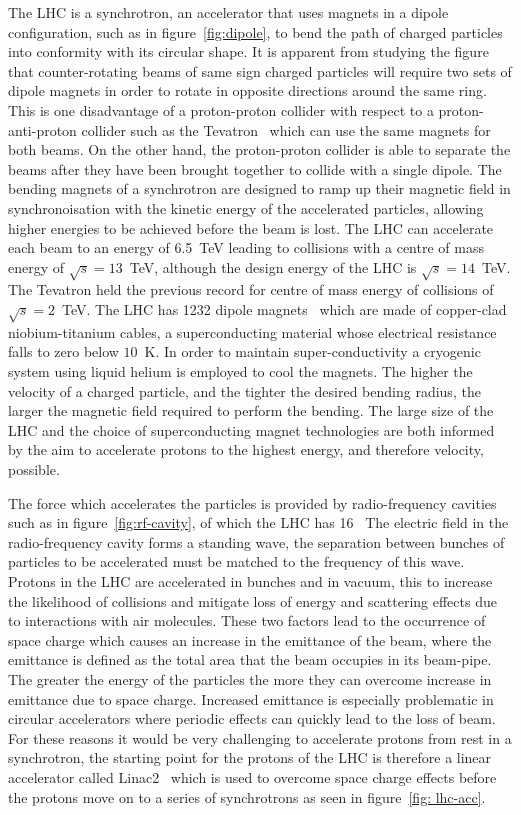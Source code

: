The LHC is a synchrotron, an accelerator that uses magnets in a dipole
configuration, such as in figure~\ref{fig:dipole}, to bend the path of charged
particles into conformity with its circular shape. It is apparent from studying
the figure that counter-rotating beams of same sign charged particles will
require two sets of dipole magnets in order to rotate in opposite directions
around the same ring. This is one disadvantage of a proton-proton collider with
respect to a proton-anti-proton collider such as the Tevatron~\cite{tevatron-01}
which can use the same magnets for both beams. On the other hand, the
proton-proton collider is able to separate the beams after they have been
brought together to collide with a single dipole. The bending magnets of a
synchrotron are designed to ramp up their magnetic field in synchronoisation
with the kinetic energy of the accelerated particles, allowing higher energies
to be achieved before the beam is lost. The LHC can accelerate each beam to an
energy of 6.5~TeV leading to collisions with a centre of mass energy of
$\sqrt{s} = 13 $~TeV, although the design energy of the LHC is $\sqrt{s} = 14
$~TeV. The Tevatron held the previous record for centre of mass energy of
collisions of $\sqrt{s} = 2 $~TeV. The LHC has 1232 dipole magnets~\cite{LHC-dr}
which are made of copper-clad niobium-titanium cables, a superconducting
material whose electrical resistance falls to zero below $10$~K. In order to
maintain super-conductivity a cryogenic system using liquid helium is employed
to cool the magnets. The higher the velocity of a charged particle, and the
tighter the desired bending radius, the larger the magnetic field required to
perform the bending. The large size of the LHC and the choice of superconducting
magnet technologies are both informed by the aim to accelerate protons to the
highest energy, and therefore velocity, possible.


The force which accelerates the particles is provided by radio-frequency
cavities such as in figure~\ref{fig:rf-cavity}, of which the LHC has
16~\cite{LHC-dr} The electric field in the radio-frequency cavity forms a
standing wave, the separation between bunches of particles to be accelerated
must be matched to the frequency of this wave. Protons in the LHC are
accelerated in bunches and in vacuum, this to increase the likelihood of
collisions and mitigate loss of energy and scattering effects due to
interactions with air molecules. These two factors lead to the occurrence of
space charge which causes an increase in the emittance of the beam, where the
emittance is defined as the total area that the beam occupies in its beam-pipe.
The greater the energy of the particles the more they can overcome increase in
emittance due to space charge. Increased emittance is especially problematic in
circular accelerators where periodic effects can quickly lead to the loss of
beam. For these reasons it would be very challenging to accelerate protons from
rest in a synchrotron, the starting point for the protons of the LHC is
therefore a linear accelerator called Linac2~\cite{linac2} which is used to
overcome space charge effects before the protons move on to a series of
synchrotrons as seen in figure~\ref{fig:
  lhc-acc}.


